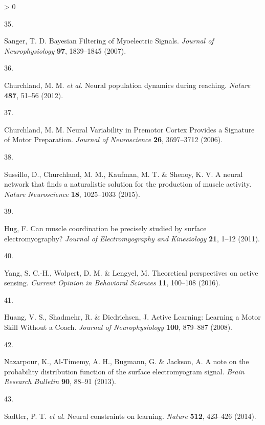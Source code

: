 \documentclass[
  a4paper,
]{article}
\newlength{\cslhangindent}
\newlength{\csllabelwidth}
\newenvironment{CSLReferences}[2] %
 {%
  \setlength{\parindent}{0pt}
  \ifodd #1 \everypar{\setlength{\hangindent}{\cslhangindent}}\ignorespaces\fi
  \ifnum #2 > 0
  \setlength{\parskip}{#2\baselineskip}
  \fi
 }%
 {}
\newcommand{\CSLLeftMargin}[1]{\parbox[t]{\csllabelwidth}{#1}}
\newcommand{\CSLRightInline}[1]{\parbox[t]{\linewidth - \csllabelwidth}{#1}\break}
\begin{document}
\begin{CSLReferences}{0}{0}
\leavevmode\hypertarget{ref-sangerBayesianFilteringMyoelectric2007}{}%
\CSLLeftMargin{35. }
\CSLRightInline{Sanger, T. D. Bayesian {Filtering} of {Myoelectric
Signals}. \emph{Journal of Neurophysiology} \textbf{97}, 1839--1845
(2007).}

\leavevmode\hypertarget{ref-churchlandNeuralPopulationDynamics2012a}{}%
\CSLLeftMargin{36. }
\CSLRightInline{Churchland, M. M. \emph{et al.} Neural population
dynamics during reaching. \emph{Nature} \textbf{487}, 51--56 (2012).}

\leavevmode\hypertarget{ref-churchlandNeuralVariabilityPremotor2006}{}%
\CSLLeftMargin{37. }
\CSLRightInline{Churchland, M. M. Neural {Variability} in {Premotor
Cortex Provides} a {Signature} of {Motor Preparation}. \emph{Journal of
Neuroscience} \textbf{26}, 3697--3712 (2006).}

\leavevmode\hypertarget{ref-sussillo2015}{}%
\CSLLeftMargin{38. }
\CSLRightInline{Sussillo, D., Churchland, M. M., Kaufman, M. T. \&
Shenoy, K. V. A neural network that finds a naturalistic solution for
the production of muscle activity. \emph{Nature Neuroscience}
\textbf{18}, 1025--1033 (2015).}

\leavevmode\hypertarget{ref-Hug2011}{}%
\CSLLeftMargin{39. }
\CSLRightInline{Hug, F. Can muscle coordination be precisely studied by
surface electromyography? \emph{Journal of Electromyography and
Kinesiology} \textbf{21}, 1--12 (2011).}

\leavevmode\hypertarget{ref-yangTheoreticalPerspectivesActive2016}{}%
\CSLLeftMargin{40. }
\CSLRightInline{Yang, S. C.-H., Wolpert, D. M. \& Lengyel, M.
Theoretical perspectives on active sensing. \emph{Current Opinion in
Behavioral Sciences} \textbf{11}, 100--108 (2016).}

\leavevmode\hypertarget{ref-huangActiveLearningLearning2008}{}%
\CSLLeftMargin{41. }
\CSLRightInline{Huang, V. S., Shadmehr, R. \& Diedrichsen, J. Active
{Learning}: {Learning} a {Motor Skill Without} a {Coach}. \emph{Journal
of Neurophysiology} \textbf{100}, 879--887 (2008).}

\leavevmode\hypertarget{ref-nazarpourNoteProbabilityDistribution2013}{}%
\CSLLeftMargin{42. }
\CSLRightInline{Nazarpour, K., Al-Timemy, A. H., Bugmann, G. \& Jackson,
A. A note on the probability distribution function of the surface
electromyogram signal. \emph{Brain Research Bulletin} \textbf{90},
88--91 (2013).}

\leavevmode\hypertarget{ref-sadtlerNeuralConstraintsLearning2014}{}%
\CSLLeftMargin{43. }
\CSLRightInline{Sadtler, P. T. \emph{et al.} Neural constraints on
learning. \emph{Nature} \textbf{512}, 423--426 (2014).}


\end{CSLReferences}
\end{document}
